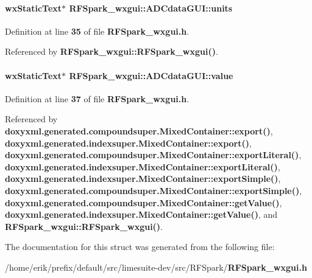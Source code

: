 \paragraph[{units}]{\setlength{\rightskip}{0pt plus 5cm}wx\+Static\+Text$\ast$ R\+F\+Spark\+\_\+wxgui\+::\+A\+D\+Cdata\+G\+U\+I\+::units}\label{structRFSpark__wxgui_1_1ADCdataGUI_a7b9e5e57990c6da2929b199e59a9afad}


Definition at line {\bf 35} of file {\bf R\+F\+Spark\+\_\+wxgui.\+h}.



Referenced by {\bf R\+F\+Spark\+\_\+wxgui\+::\+R\+F\+Spark\+\_\+wxgui()}.

\paragraph[{value}]{\setlength{\rightskip}{0pt plus 5cm}wx\+Static\+Text$\ast$ R\+F\+Spark\+\_\+wxgui\+::\+A\+D\+Cdata\+G\+U\+I\+::value}\label{structRFSpark__wxgui_1_1ADCdataGUI_aec06af667174f314b51770ecb62a2fa4}


Definition at line {\bf 37} of file {\bf R\+F\+Spark\+\_\+wxgui.\+h}.



Referenced by {\bf doxyxml.\+generated.\+compoundsuper.\+Mixed\+Container\+::export()}, {\bf doxyxml.\+generated.\+indexsuper.\+Mixed\+Container\+::export()}, {\bf doxyxml.\+generated.\+compoundsuper.\+Mixed\+Container\+::export\+Literal()}, {\bf doxyxml.\+generated.\+indexsuper.\+Mixed\+Container\+::export\+Literal()}, {\bf doxyxml.\+generated.\+indexsuper.\+Mixed\+Container\+::export\+Simple()}, {\bf doxyxml.\+generated.\+compoundsuper.\+Mixed\+Container\+::export\+Simple()}, {\bf doxyxml.\+generated.\+compoundsuper.\+Mixed\+Container\+::get\+Value()}, {\bf doxyxml.\+generated.\+indexsuper.\+Mixed\+Container\+::get\+Value()}, and {\bf R\+F\+Spark\+\_\+wxgui\+::\+R\+F\+Spark\+\_\+wxgui()}.



The documentation for this struct was generated from the following file\+:\begin{DoxyCompactItemize}
\item 
/home/erik/prefix/default/src/limesuite-\/dev/src/\+R\+F\+Spark/{\bf R\+F\+Spark\+\_\+wxgui.\+h}\end{DoxyCompactItemize}
